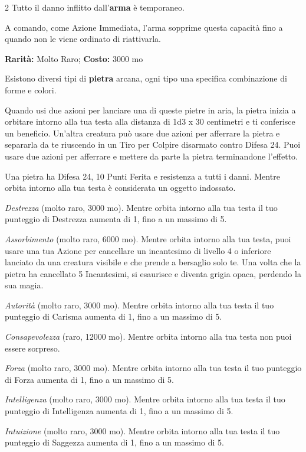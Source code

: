 \begin{multicols}{2}
Tutto il danno inflitto dall'\textbf{arma} è temporaneo.

A comando, come Azione Immediata, l'arma sopprime questa capacità fino a quando non le viene ordinato di riattivarla.


\textbf{Rarità:} Molto Raro; \textbf{Costo:} 3000 mo

Esistono diversi tipi di \textbf{pietra} arcana, ogni tipo una specifica combinazione di forme e colori.

Quando usi due azioni per lanciare una di queste pietre in aria, la pietra inizia a orbitare intorno alla tua testa alla distanza di 1d3 x 30 centimetri e ti conferisce un beneficio.
Un'altra creatura può usare due azioni per afferrare la pietra e separarla da te riuscendo in un Tiro per Colpire disarmato contro Difesa 24. Puoi usare due azioni per afferrare e mettere da parte la pietra terminandone l'effetto.

Una pietra ha Difesa 24, 10 Punti Ferita e resistenza a tutti i danni. Mentre orbita intorno alla tua testa è considerata un oggetto indossato.

\emph{Destrezza} (molto raro, 3000 mo). Mentre orbita intorno alla tua testa il tuo punteggio di Destrezza aumenta di 1, fino a un massimo di 5.

\emph{Assorbimento} (molto raro, 6000 mo). Mentre orbita intorno alla tua testa, puoi usare una tua Azione per cancellare un incantesimo di livello 4 o inferiore lanciato da una creatura visibile e che prende a bersaglio solo te. Una volta che la pietra ha cancellato 5 Incantesimi, si esaurisce e diventa grigia opaca, perdendo la sua magia.

\emph{Autorità} (molto raro, 3000 mo). Mentre orbita intorno alla tua testa il tuo punteggio di Carisma aumenta di 1, fino a un massimo di 5.

\emph{Consapevolezza} (raro, 12000 mo). Mentre orbita intorno alla tua testa non puoi essere sorpreso.

\emph{Forza} (molto raro, 3000 mo). Mentre orbita intorno alla tua testa il tuo punteggio di Forza aumenta di 1, fino a un massimo di 5.

\emph{Intelligenza} (molto raro, 3000 mo). Mentre orbita intorno alla tua testa il tuo punteggio di Intelligenza aumenta di 1, fino a un massimo di 5.

\emph{Intuizione} (molto raro, 3000 mo). Mentre orbita intorno alla tua testa il tuo punteggio di Saggezza aumenta di 1, fino a un massimo di 5.


\end{multicols}
